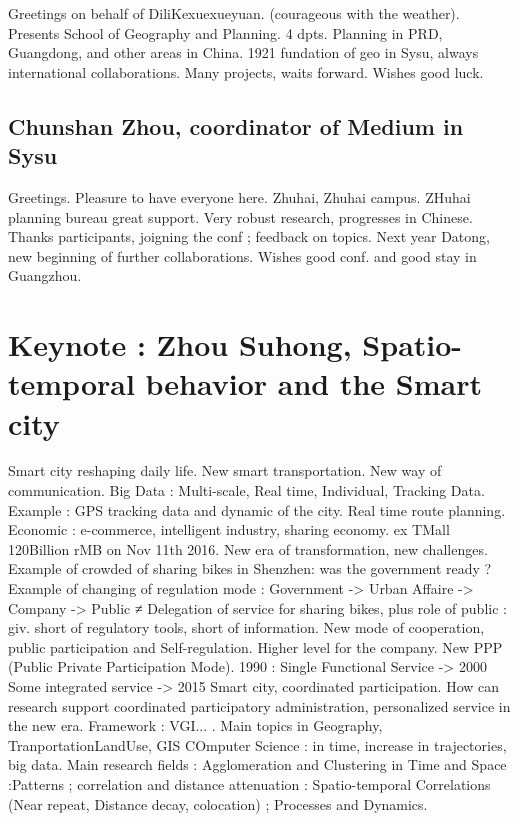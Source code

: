 \documentclass[11pt]{article}
\begin{document}
Greetings on behalf of DiliKexuexueyuan. (courageous with the weather). Presents School of Geography and Planning. 4 dpts. Planning in PRD, Guangdong, and other areas in China. 1921 fundation of geo in Sysu, always international collaborations. Many projects, waits forward. Wishes good luck.


\subsection*{Chunshan Zhou, coordinator of Medium in Sysu}

Greetings. Pleasure to have everyone here. Zhuhai, Zhuhai campus. ZHuhai planning bureau great support. Very robust research, progresses in Chinese. Thanks participants, joigning the conf ; feedback on topics. Next year Datong, new beginning of further collaborations. Wishes good conf. and good stay in Guangzhou.



\section*{Keynote : Zhou Suhong, Spatio-temporal behavior and the Smart city}

Smart city reshaping daily life. New smart transportation. New way of communication. Big Data : Multi-scale, Real time, Individual, Tracking Data. Example : GPS tracking data and dynamic of the city. Real time route planning. Economic : e-commerce, intelligent industry, sharing economy. ex TMall 120Billion rMB on Nov 11th 2016. New era of transformation, new challenges. Example of crowded of sharing bikes in Shenzhen: was the government ready ? Example of changing of regulation mode : Government -> Urban Affaire -> Company -> Public ≠ Delegation of service for sharing bikes, plus role of public : giv. short of regulatory tools, short of information. New mode of cooperation, public participation and Self-regulation. Higher level for the company. New PPP (Public Private Participation Mode). 1990 : Single Functional Service -> 2000 Some integrated service -> 2015 Smart city, coordinated participation. How can research support coordinated participatory administration, personalized service in the new era. Framework : VGI... . Main topics in Geography, TranportationLandUse, GIS COmputer Science : in time, increase in trajectories, big data. Main research fields : Agglomeration and Clustering in Time and Space :Patterns ; correlation and distance attenuation : Spatio-temporal Correlations (Near repeat, Distance decay, colocation) ; Processes and Dynamics.
\end{document}
